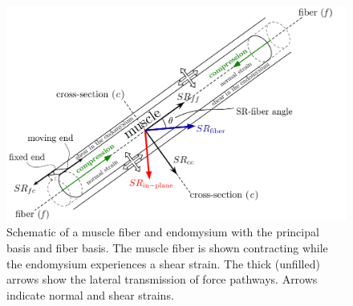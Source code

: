 \begin{figure}[!htb]
\vspace{+0.2cm}
\centering
\includegraphics[scale=0.6]{Figures/SRYO_Schematic.pdf}
\caption[Schematic of a muscle fiber and endomysium with the principal basis and fiber basis]{Schematic of a muscle fiber and endomysium with the principal basis and fiber basis. The muscle fiber is shown contracting while the endomysium experiences a shear strain. The thick (unfilled) arrows show the lateral transmission of force pathways. Arrows indicate normal and shear strains.}
\label{fig: SR2_1}
\end{figure}
